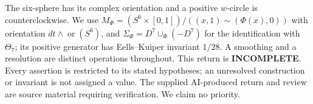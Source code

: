 The six-sphere has its complex orientation and a positive $w$-circle
is counterclockwise. We use
$M_\Phi=(S^6\times[0,1])/((x,1)\sim(\Phi(x),0))$ with orientation
$dt\wedge\operatorname{or}(S^6)$, and
$\Sigma_\Phi=D^7\cup_\Phi(-D^7)$ for the identification with
$\Theta_7$; its positive generator has Eells--Kuiper invariant $1/28$.
A smoothing and a resolution are distinct operations throughout.
This return is \textbf{INCOMPLETE}. Every assertion is restricted to its
stated hypotheses; an unresolved construction or invariant is not
assigned a value. The supplied AI-produced return and review are
source material requiring verification. We claim no priority.

